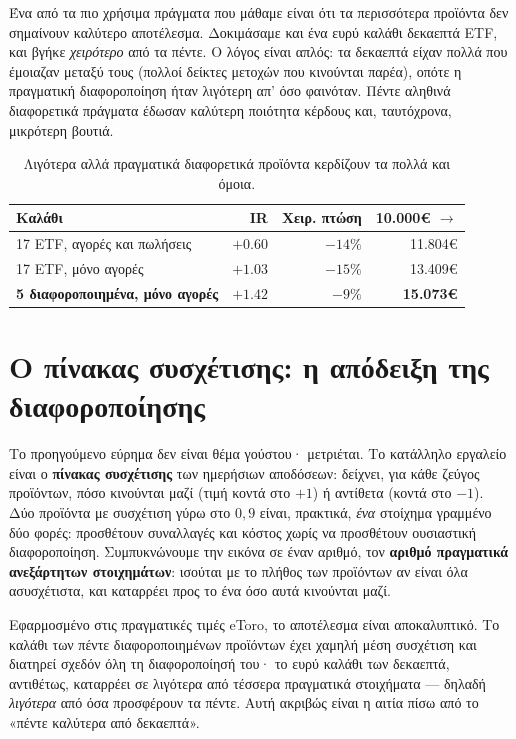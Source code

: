 \documentclass[11pt]{article}
\newcommand{\eur}{€}
\begin{document}
Ένα από τα πιο χρήσιμα πράγματα που μάθαμε είναι ότι τα περισσότερα προϊόντα δεν σημαίνουν καλύτερο
αποτέλεσμα. Δοκιμάσαμε και ένα ευρύ καλάθι δεκαεπτά ETF, και βγήκε \emph{χειρότερο} από τα πέντε. Ο
λόγος είναι απλός: τα δεκαεπτά είχαν πολλά που έμοιαζαν μεταξύ τους (πολλοί δείκτες μετοχών που κινούνται
παρέα), οπότε η πραγματική διαφοροποίηση ήταν λιγότερη απ' όσο φαινόταν. Πέντε αληθινά διαφορετικά
πράγματα έδωσαν καλύτερη ποιότητα κέρδους και, ταυτόχρονα, μικρότερη βουτιά.

\begin{table}[ht]\centering\small
\begin{tabular}{lrrr}\toprule
Καλάθι & IR & Χειρ. πτώση & 10.000\eur{} $\to$ \\\midrule
17 ETF, αγορές και πωλήσεις & $+0.60$ & $-14\%$ & 11.804\eur{} \\
17 ETF, μόνο αγορές & $+1.03$ & $-15\%$ & 13.409\eur{} \\
\textbf{5 διαφοροποιημένα, μόνο αγορές} & \textcolor{good}{\textbf{$+1.42$}} & $-9\%$ & \textcolor{good}{\textbf{15.073\eur{}}} \\
\bottomrule\end{tabular}
\caption{Λιγότερα αλλά πραγματικά διαφορετικά προϊόντα κερδίζουν τα πολλά και όμοια.}
\end{table}

\section{Ο πίνακας συσχέτισης: η απόδειξη της διαφοροποίησης}

Το προηγούμενο εύρημα δεν είναι θέμα γούστου· μετριέται. Το κατάλληλο εργαλείο είναι ο
\textbf{πίνακας συσχέτισης} των ημερήσιων αποδόσεων: δείχνει, για κάθε ζεύγος προϊόντων, πόσο κινούνται
μαζί (τιμή κοντά στο $+1$) ή αντίθετα (κοντά στο $-1$). Δύο προϊόντα με συσχέτιση γύρω στο $0{,}9$
είναι, πρακτικά, \emph{ένα} στοίχημα γραμμένο δύο φορές: προσθέτουν συναλλαγές και κόστος χωρίς να
προσθέτουν ουσιαστική διαφοροποίηση. Συμπυκνώνουμε την εικόνα σε έναν αριθμό, τον \textbf{αριθμό
πραγματικά ανεξάρτητων στοιχημάτων}: ισούται με το πλήθος των προϊόντων αν είναι όλα ασυσχέτιστα, και
καταρρέει προς το ένα όσο αυτά κινούνται μαζί.

Εφαρμοσμένο στις πραγματικές τιμές eToro, το αποτέλεσμα είναι αποκαλυπτικό. Το καλάθι των πέντε
διαφοροποιημένων προϊόντων έχει χαμηλή μέση συσχέτιση και διατηρεί σχεδόν όλη τη διαφοροποίησή του· το
ευρύ καλάθι των δεκαεπτά, αντιθέτως, καταρρέει σε λιγότερα από τέσσερα πραγματικά στοιχήματα --- δηλαδή
\emph{λιγότερα} από όσα προσφέρουν τα πέντε. Αυτή ακριβώς είναι η αιτία πίσω από το «πέντε καλύτερα από
δεκαεπτά».
\end{document}
